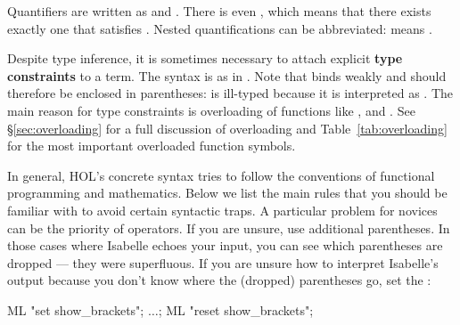 Quantifiers are written as
 and
.  There is
even , which
means that there exists exactly one  that satisfies .  Nested
quantifications can be abbreviated:  means
.

Despite type inference, it is sometimes necessary to attach explicit
\textbf{type constraints} to a term.  The syntax is
 as in . Note that
 binds weakly and should therefore be enclosed
in parentheses:  is ill-typed because it is interpreted as
. The main reason for type constraints is overloading of
functions like \isa{+}, \isa{*} and \isa{<}. See {\S}\ref{sec:overloading} for
a full discussion of overloading and Table~\ref{tab:overloading} for the most
important overloaded function symbols.

\begin{warn}
In general, HOL's concrete syntax tries to follow the conventions of
functional programming and mathematics. Below we list the main rules that you
should be familiar with to avoid certain syntactic traps. A particular
problem for novices can be the priority of operators. If you are unsure, use
additional parentheses. In those cases where Isabelle echoes your
input, you can see which parentheses are dropped --- they were superfluous. If
you are unsure how to interpret Isabelle's output because you don't know
where the (dropped) parentheses go, set the 
:
\begin{ttbox}
ML "set show_brackets"; \(\dots\); ML "reset show_brackets";
\end{ttbox}
\end{warn}

